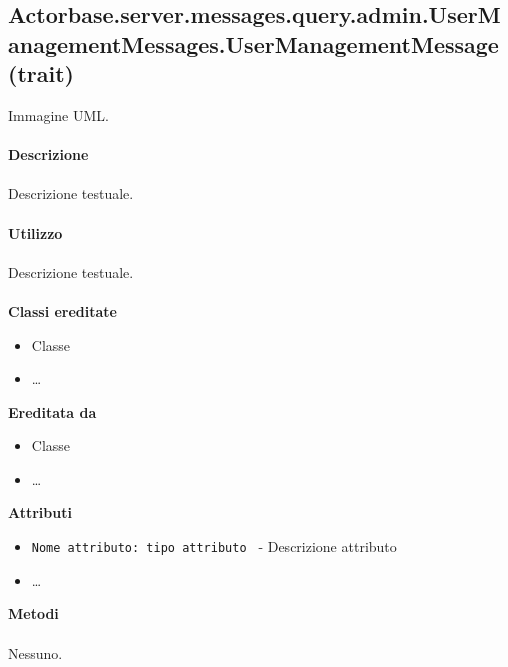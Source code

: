 \documentclass[a4paper]{article}
\begin{document}
	\subsection{Actorbase.server.messages.query.admin.UserManagementMessages.UserManagementMessage (trait)}
		Immagine UML.
		\\ \\
		\textbf{Descrizione}
			\\ \\
			Descrizione testuale.
			\\ \\
		\textbf{Utilizzo}
			\\ \\
			Descrizione testuale.
			\\ \\
		\textbf{Classi ereditate}
			\begin{itemize}
				\item Classe
				\item \dots
			\end{itemize}
		\textbf{Ereditata da}
			\begin{itemize}
				\item Classe
				\item \dots
			\end{itemize}
		\textbf{Attributi}
			\begin{itemize}
				\item \texttt{Nome attributo: tipo attributo } - Descrizione attributo
				\item \dots
			\end{itemize}
		\textbf{Metodi}
			\\ \\
			Nessuno.
		
\end{document}
